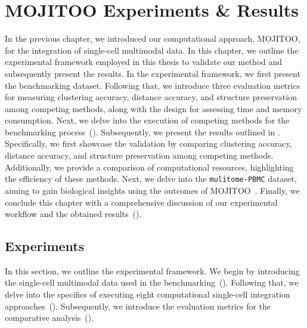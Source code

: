%
\chapter{MOJITOO Experiments \& Results }
\label{chapter:MOJITOO_bench}

\graphicspath{{chapter5/figs}}
In the previous chapter, we introduced our computational approach, MOJITOO, for the integration of single-cell multimodal data. In this chapter, we outline the experimental framework employed in this thesis to validate our method and subsequently present the results. In the experimental framework, we first present the benchmarking dataset. Following that, we introduce three evaluation metrics for measuring clustering accuracy, distance accuracy, and structure preservation among competing methods, along with the design for assessing time and memory consumption. Next, we delve into the execution of competing methods for the benchmarking process~(). Subsequently, we present the results outlined in . Specifically, we first showcase the validation by comparing clustering accuracy, distance accuracy, and structure preservation among competing methods. Additionally, we provide a comparison of computational resources, highlighting the efficiency of these methods. Next, we delve into the \texttt{mulitome-PBMC} dataset, aiming to gain biological insights using the outcomes of MOJITOO~. Finally, we conclude this chapter with a comprehensive discussion of our experimental workflow and the obtained results~().


\section{Experiments}
\label{MOJITOO:exp}
In this section, we outline the experimental framework. We begin by introducing the single-cell multimodal data used in the benchmarking~(). Following that, we delve into the specifics of executing eight computational single-cell integration approaches~(). Subsequently, we introduce the evaluation metrics for the comparative analysis~().

